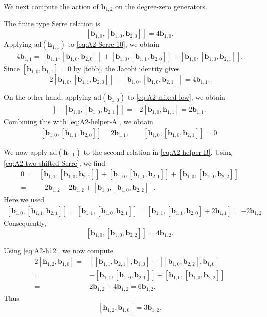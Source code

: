 \documentclass[11pt,reqno]{amsart}
\numberwithin{equation}{section}
\theoremstyle{definition}
\theoremstyle{remark}
\newcommand{\bb}{\mathbf{b}}
\newcommand{\bh}{\mathbf{h}}
\newcommand{\ad}{\mathrm{ad}}
\begin{document}
We next compute the action of $\bh_{1,2}$ on the degree-zero
generators. 

The finite type Serre relation is
\begin{equation}\label{eq:A2-Serre-10}
[\bb_{1,0},[\bb_{1,0},\bb_{2,0}]]
=
4\bb_{1,0}.
\end{equation}
Applying $\ad(\bh_{1,1})$ to
\eqref{eq:A2-Serre-10}, we obtain
\begin{align*}
4\bb_{1,1}
=
[\bb_{1,1},[\bb_{1,0},\bb_{2,0}]]
+
[\bb_{1,0},[\bb_{1,1},\bb_{2,0}]]
+
[\bb_{1,0},[\bb_{1,0},\bb_{2,1}]].
\end{align*}
Since $[\bb_{1,0},\bb_{1,1}]=0$ by \eqref{tcbb}, the Jacobi identity gives
\begin{equation}\label{eq:A2-helper-A}
2[\bb_{1,0},[\bb_{1,1},\bb_{2,0}]]
+
[\bb_{1,0},[\bb_{1,0},\bb_{2,1}]]
=
4\bb_{1,1}.
\end{equation}

On the other hand, applying $\ad(\bb_{1,0})$ to
\eqref{eq:A2-mixed-low}, we obtain
\begin{align*}
[\bb_{1,0},[\bb_{1,1},\bb_{2,0}]]
-
[\bb_{1,0},[\bb_{1,0},\bb_{2,1}]]
=
-2[\bb_{1,0},\bh_{1,1}]
=
2\bb_{1,1}.
\end{align*}
Combining this with \eqref{eq:A2-helper-A}, we obtain
\begin{align}\label{eq:A2-helper-B}
[\bb_{1,0},[\bb_{1,1},\bb_{2,0}]]
=
2\bb_{1,1},
\qquad 
[\bb_{1,0},[\bb_{1,0},\bb_{2,1}]]
=
0.
\end{align}

We now apply $\ad(\bh_{1,1})$ to the second relation in 
\eqref{eq:A2-helper-B}.  Using
\eqref{eq:A2-two-shifted-Serre}, we find
\begin{align*}
0
={}&
[\bb_{1,1},[\bb_{1,0},\bb_{2,1}]]
+
[\bb_{1,0},[\bb_{1,1},\bb_{2,1}]]
+
[\bb_{1,0},[\bb_{1,0},\bb_{2,2}]]
\\
={}&
-2\bb_{1,2}
-2\bb_{1,2}
+
[\bb_{1,0},[\bb_{1,0},\bb_{2,2}]].
\end{align*}
Here we used
\begin{align}\label{helper865}
[\bb_{1,0},[\bb_{1,1},\bb_{2,1}]]=[\bb_{1,1},[\bb_{1,0},\bb_{2,1}]]
=
[\bb_{1,1},
[\bb_{1,1},\bb_{2,0}]+2\bh_{1,1}]
=
-2\bb_{1,2}.
\end{align}
Consequently,
\begin{equation}\label{eq:A2-b10b10b22}
[\bb_{1,0},[\bb_{1,0},\bb_{2,2}]]
=
4\bb_{1,2}.
\end{equation}

Using \eqref{eq:A2-h12}, we now compute
\begin{align*}
2[\bh_{1,2},\bb_{1,0}]
={}&
[[\bb_{1,1},\bb_{2,1}],\bb_{1,0}]
-
[[\bb_{1,0},\bb_{2,2}],\bb_{1,0}]
\\
={}&
-[\bb_{1,1},[\bb_{1,0},\bb_{2,1}]]
+
[\bb_{1,0},[\bb_{1,0},\bb_{2,2}]]
\\
={}&
2\bb_{1,2}+4\bb_{1,2}
=
6\bb_{1,2}.
\end{align*}
Thus
\begin{equation}\label{eq:A2-h12b10}
[\bh_{1,2},\bb_{1,0}]
=
3\bb_{1,2}.
\end{equation}
\end{document}
